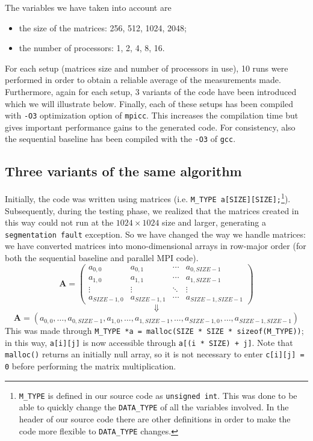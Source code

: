 \documentclass[11pt]{article}
\begin{document}
The variables we have taken into account are
\begin{itemize}
     \item the size of the matrices: 256, 512, 1024, 2048;
     \item the number of processors: 1, 2, 4, 8, 16.
\end{itemize}

For each setup (matrices size and number of processors in use), 10 runs were performed in order to obtain a reliable average of the measurements made. Furthermore, again for each setup, 3 variants of the code have been introduced which we will illustrate below. Finally, each of these setups has been compiled with \verb|-O3| optimization option of \verb|mpicc|. This increases the compilation time but gives important performance gains to the generated code. For consistency, also the sequential baseline has been compiled with the \verb|-O3| of \verb|gcc|.

\subsection{Three variants of the same algorithm}
Initially, the code was written using matrices (i.e. \verb|M_TYPE a[SIZE][SIZE];|\footnote{\texttt{M\_TYPE} is defined in our source code as \texttt{unsigned int}. This was done to be able to quickly change the \texttt{DATA\_TYPE} of all the variables involved. In the header of our source code there are other definitions in order to make the code more flexible to \texttt{DATA\_TYPE} changes.}). Subsequently, during the testing phase, we realized that the matrices created in this way could not run at the $1024 \times 1024$ size and larger, generating a \verb|segmentation fault| exception. So we have changed the way we handle matrices: we have converted matrices into mono-dimensional arrays in row-major order (for both the sequential baseline and parallel MPI code).
\[ \mathbf{A} = \begin{pmatrix}
    a_{0,0} & a_{0,1} & \cdots & a_{0,SIZE-1} \\
    a_{1,0} & a_{1,1} & \cdots & a_{1,SIZE-1} \\
    \vdots  & \vdots  & \ddots & \vdots  \\
    a_{SIZE-1,0} & a_{SIZE-1,1} & \cdots & a_{SIZE-1,SIZE-1} 
\end{pmatrix} \]\[ \Downarrow \]\[ \mathbf{A} = \left( a_{0,0}, \dots, a_{0,SIZE-1}, a_{1,0}, \dots, a_{1,SIZE-1}, \dots, a_{SIZE-1,0}, \dots, a_{SIZE-1,SIZE-1} \right)\]
This was made through \verb|M_TYPE *a = malloc(SIZE * SIZE * sizeof(M_TYPE))|; in this way, \verb|a[i][j]| is now accessible through \verb|a[(i * SIZE) + j]|. Note that \verb|malloc()| returns an initially null array, so it is not necessary to enter \verb|c[i][j] = 0| before performing the matrix multiplication.
\end{document}
